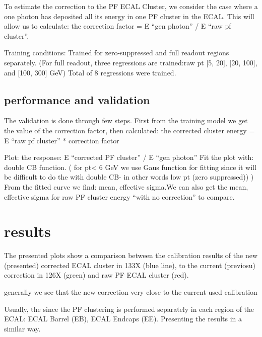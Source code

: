 To estimate the correction to  the PF ECAL Cluster, we consider the case where a one photon has deposited all its energy in one PF cluster in the ECAL.
This will allow us to calculate: the correction factor = E “gen photon” / E “raw pf cluster”.


Training conditions:
Trained for zero-suppressed and full readout regions separately.
(For full readout, three regressions are trained:raw pt [5, 20], [20, 100], and [100, 300] GeV)
Total of 8 regressions were trained.

\subsection{performance and validation}
The validation is done through few steps.
First from the training model we get the value of the correction factor, then  calculated:  the corrected cluster energy = E “raw pf cluster” * correction factor

Plot: the response: E “corrected PF cluster” / E “gen photon”
Fit the plot with: double CB function. ( for pt< 6 GeV we use Gaus function for fitting since it will be difficult to do the with double CB- in other words low pt (zero suppressed)) ) 
From the fitted curve we find: mean, effective sigma.We can also get the mean, effective sigma for raw PF cluster energy “with no correction” to compare.

\section{results}

The presented plots show a comparison between the calibration results of the new (presented) corrected ECAL cluster in 133X (blue line), to the current (previosu)  correction in 126X (green) and  raw PF ECAL cluster (red).

generally we see that the new correction very close to the current used calibration

Usually, the since the PF clustering is performed separately in each region of the ECAL: ECAL Barrel (EB), ECAL Endcaps (EE).
Presenting the results in a similar way.

